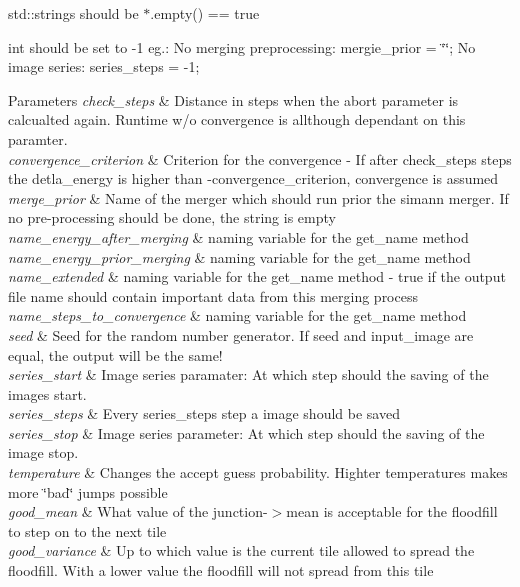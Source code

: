 \begin{DoxyItemize}
\item std\-::strings should be $\ast$.empty() == true
\item int should be set to -\/1 eg.\-: No merging preprocessing\-: mergie\-\_\-prior = \char`\"{}\char`\"{}; No image series\-: series\-\_\-steps = -\/1; 
\begin{DoxyParams}{Parameters}
{\em check\-\_\-steps} & Distance in steps when the abort parameter is calcualted again. Runtime w/o convergence is allthough dependant on this paramter. \\
\hline
{\em convergence\-\_\-criterion} & Criterion for the convergence -\/ If after check\-\_\-steps steps the detla\-\_\-energy is higher than -\/convergence\-\_\-criterion, convergence is assumed \\
\hline
{\em merge\-\_\-prior} & Name of the merger which should run prior the simann merger. If no pre-\/processing should be done, the string is empty \\
\hline
{\em name\-\_\-energy\-\_\-after\-\_\-merging} & naming variable for the get\-\_\-name method \\
\hline
{\em name\-\_\-energy\-\_\-prior\-\_\-merging} & naming variable for the get\-\_\-name method \\
\hline
{\em name\-\_\-extended} & naming variable for the get\-\_\-name method -\/ true if the output file name should contain important data from this merging process \\
\hline
{\em name\-\_\-steps\-\_\-to\-\_\-convergence} & naming variable for the get\-\_\-name method \\
\hline
{\em seed} & Seed for the random number generator. If seed and input\-\_\-image are equal, the output will be the same! \\
\hline
{\em series\-\_\-start} & Image series paramater\-: At which step should the saving of the images start. \\
\hline
{\em series\-\_\-steps} & Every series\-\_\-steps step a image should be saved \\
\hline
{\em series\-\_\-stop} & Image series parameter\-: At which step should the saving of the image stop. \\
\hline
{\em temperature} & Changes the accept guess probability. Highter temperatures makes more \char`\"{}bad\char`\"{} jumps possible \\
\hline
{\em good\-\_\-mean} & What value of the junction-\/$>$mean is acceptable for the floodfill to step on to the next tile \\
\hline
{\em good\-\_\-variance} & Up to which value is the current tile allowed to spread the floodfill. With a lower value the floodfill will not spread from this tile \\
\hline
\end{DoxyParams}

\end{DoxyItemize}

